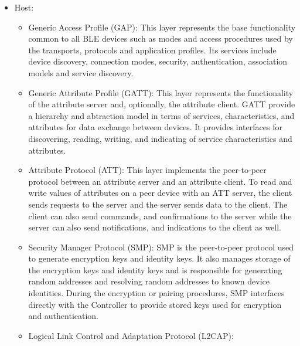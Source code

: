 \begin{itemize}
    \item Host:
        \begin{itemize}
            \item Generic Access Profile (GAP):
                This layer represents the base functionality common to all 
                BLE devices such as modes and access procedures used by the 
                transports, protocols and application profiles. Its services 
                include device discovery, connection modes, security, 
                authentication, association models and service 
                discovery. \cite[p.~198]{Ble19}
            \item Generic Attribute Profile (GATT):
                This layer represents the functionality of the attribute server 
                and, optionally, the attribute client.
                GATT provide a hierarchy and abtraction model in terms of services,
                characteristics, and attributes for data exchange between devices.
                It provides interfaces for discovering, reading, writing, and 
                indicating of service characteristics and 
                attributes. \cite[p.~198]{Ble19} 
            \item Attribute Protocol (ATT):
                This layer implements the peer-to-peer protocol between an 
                attribute server and an attribute client. To read and write 
                values of attributes on a peer device with an ATT server, the 
                client sends requests to the server and the server sends data 
                to the client. The client can also send commands, and confirmations
                to the server while the server can also send notifications, and 
                indications to the client as well. \cite[p.~198]{Ble19}
            \item Security Manager Protocol (SMP):
                SMP is the peer-to-peer protocol used to generate encryption keys 
                and identity keys. It also manages storage of the encryption keys 
                and identity keys and is responsible for generating random addresses 
                and resolving random addresses to known device identities. 
                During the encryption or pairing procedures, SMP interfaces directly 
                with the Controller to provide stored keys used for encryption 
                and authentication. \cite[p.~197-198]{Ble19}
            \item Logical Link Control and Adaptation Protocol (L2CAP):

\end{itemize}
\end{itemize}

